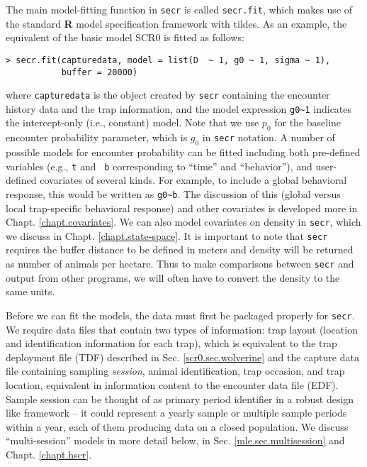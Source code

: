 The main model-fitting function in   \mbox{\tt secr} is called
\mbox{\tt secr.fit}, which 
makes use of the
standard {\bf R} model specification framework with tildes. 
As an example, the equivalent of the
basic model SCR0  is fitted as follows: 
{\small
\begin{verbatim}
> secr.fit(capturedata, model = list(D  ~ 1, g0 ~ 1, sigma ~ 1), 
           buffer = 20000)
\end{verbatim}
}
{\flushleft where} \mbox{\tt capturedata} is the  object created by \mbox{\tt secr}
containing the encounter history data and the trap information, and
the model expression \verb#g0~1# indicates the intercept-only (i.e.,
constant) model.  Note that we use $p_{0}$ for the baseline encounter
probability parameter, which is $g_{0}$ in \mbox{\tt secr} notation.
A number of possible models for encounter probability can be fitted
including both pre-defined variables (e.g., \mbox{\tt t} and \mbox{\tt
  b} corresponding to ``time'' and ``behavior''), and user-defined
covariates of several kinds.  For example, to include a global
behavioral response, this would be written as \verb#g0~b#.  The
discussion of this (global versus local trap-specific behavioral
response) and other covariates is developed more in
Chapt. \ref{chapt.covariates}.  We can also model covariates on
density in \mbox{\tt secr}, which we discuss in Chapt. \ref{chapt.state-space}.
It is important to note that \mbox{\tt secr} requires the buffer distance to be
defined in meters and density will be returned as number of animals
per hectare.  Thus to make comparisons between \mbox{\tt secr} and
output from other programs, 
we will often have to convert the density to the same units.



Before we can fit the models, the data must first be packaged properly
for 
\mbox{\tt secr}.  
We require data files that contain two types of information:
trap layout (location and
identification information for each trap), which is equivalent to the
trap deployment file (TDF) described in Sec. \ref{scr0.sec.wolverine}
and the capture data file containing 
sampling {\it session}, animal identification, trap occasion, and trap
location,  equivalent in information content to the encounter data file (EDF).
Sample session can be thought of as primary period identifier in a
robust design like framework -- it could represent a yearly sample or
multiple sample periods within a year, each of them producing data on
a closed population. We discuss ``multi-session'' models in more
detail below, in Sec. \ref{mle.sec.multisession} and Chapt. \ref{chapt.hscr}.


